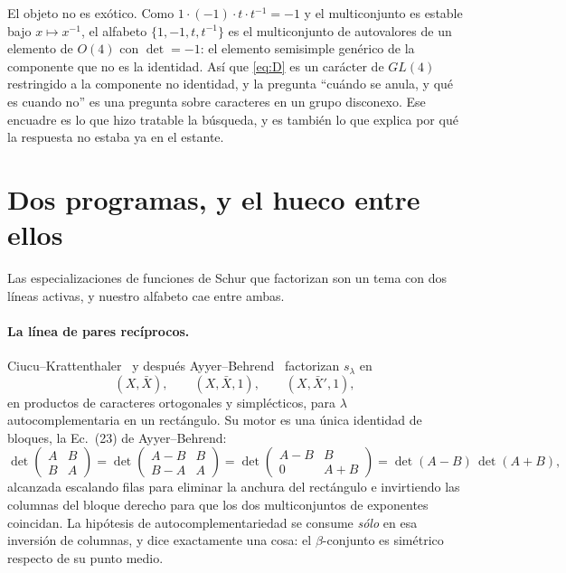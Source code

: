 \documentclass[11pt,a4paper]{article}
\begin{document}
El objeto no es ex\'otico. Como $1\cdot(-1)\cdot t\cdot t^{-1}=-1$ y el multiconjunto es
estable bajo $x\mapsto x^{-1}$, el alfabeto $\{1,-1,t,t^{-1}\}$ es el multiconjunto de
autovalores de un elemento de $O(4)$ con $\det=-1$: el elemento semisimple gen\'erico de la
componente que no es la identidad. As\'i que \eqref{eq:D} es un car\'acter de $GL(4)$
restringido a la componente no identidad, y la pregunta ``cu\'ando se anula, y qu\'e es
cuando no'' es una pregunta sobre caracteres en un grupo disconexo. Ese encuadre es lo que hizo
tratable la b\'usqueda, y es tambi\'en lo que explica por qu\'e la respuesta no estaba ya en el
estante.

\section{Dos programas, y el hueco entre ellos}\label{sec:gap}

Las especializaciones de funciones de Schur que factorizan son un tema con dos l\'ineas
activas, y nuestro alfabeto cae entre ambas.

\paragraph{La l\'inea de pares rec\'iprocos.} Ciucu--Krattenthaler~\cite{CK} y despu\'es
Ayyer--Behrend~\cite{AB} factorizan $s_\lambda$ en
\begin{equation}\label{eq:ABalphabets}
(X,\bar X),\qquad (X,\bar X,1),\qquad (X,\bar X',1),
\end{equation}
en productos de caracteres ortogonales y simpl\'ecticos, para $\lambda$ autocomplementaria en un
rect\'angulo. Su motor es una \'unica identidad de bloques, la Ec.~(23) de Ayyer--Behrend:
\begin{equation}\label{eq:blockid}
\det\begin{pmatrix}A&B\\B&A\end{pmatrix}
=\det\begin{pmatrix}A-B&B\\B-A&A\end{pmatrix}
=\det\begin{pmatrix}A-B&B\\0&A+B\end{pmatrix}
=\det(A-B)\,\det(A+B),
\end{equation}
alcanzada escalando filas para eliminar la anchura del rect\'angulo e invirtiendo las columnas
del bloque derecho para que los dos multiconjuntos de exponentes coincidan. La hip\'otesis de
autocomplementariedad se consume \emph{s\'olo} en esa inversi\'on de columnas, y dice
exactamente una cosa: el $\beta$-conjunto es sim\'etrico respecto de su punto medio.
\end{document}
